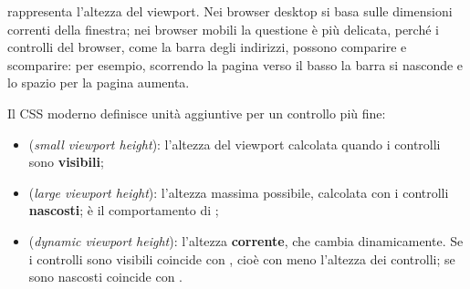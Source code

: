  rappresenta l'altezza del viewport. Nei browser desktop si basa
sulle dimensioni correnti della finestra; nei browser mobili la questione è più
delicata, perché i controlli del browser, come la barra degli indirizzi, possono
comparire e scomparire: per esempio, scorrendo la pagina verso il basso la barra
si nasconde e lo spazio per la pagina aumenta.

Il CSS moderno definisce unità aggiuntive per un controllo più fine:

\begin{itemize}
  \item {} (\textit{small viewport height}): l'altezza del viewport
        calcolata quando i controlli sono \textbf{visibili};
  \item {} (\textit{large viewport height}): l'altezza massima
        possibile, calcolata con i controlli \textbf{nascosti}; è il
        comportamento di ;
  \item {} (\textit{dynamic viewport height}): l'altezza
        \textbf{corrente}, che cambia dinamicamente. Se i controlli sono
        visibili coincide con , cioè con  meno l'altezza dei
        controlli; se sono nascosti coincide con .
\end{itemize}

